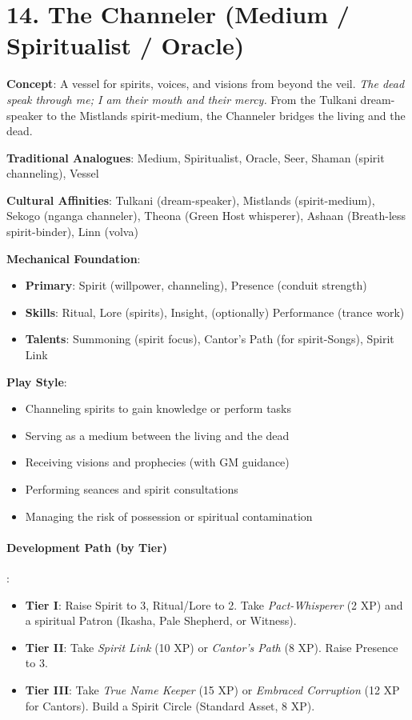 \section{14. The Channeler (Medium / Spiritualist / Oracle)}
\label{sec:concept-channeler}

\textbf{Concept}: A vessel for spirits, voices, and visions from beyond the veil. \emph{The dead speak through me; I am their mouth and their mercy.} From the Tulkani dream-speaker to the Mistlands spirit-medium, the Channeler bridges the living and the dead.

\textbf{Traditional Analogues}: Medium, Spiritualist, Oracle, Seer, Shaman (spirit channeling), Vessel

\textbf{Cultural Affinities}: Tulkani (dream-speaker), Mistlands (spirit-medium), Sekogo (nganga channeler), Theona (Green Host whisperer), Ashaan (Breath-less spirit-binder), Linn (volva)

\textbf{Mechanical Foundation}:
\begin{itemize}
\item \textbf{Primary}: Spirit (willpower, channeling), Presence (conduit strength)
\item \textbf{Skills}: Ritual, Lore (spirits), Insight, (optionally) Performance (trance work)
\item \textbf{Talents}: Summoning (spirit focus), Cantor's Path (for spirit-Songs), Spirit Link
\end{itemize}

\textbf{Play Style}:
\begin{itemize}
\item Channeling spirits to gain knowledge or perform tasks
\item Serving as a medium between the living and the dead
\item Receiving visions and prophecies (with GM guidance)
\item Performing seances and spirit consultations
\item Managing the risk of possession or spiritual contamination
\end{itemize}

\paragraph{Development Path (by Tier)}:
\begin{itemize}
\item \textbf{Tier I}: Raise Spirit to 3, Ritual/Lore to 2. Take \emph{Pact-Whisperer} (2 XP) and a spiritual Patron (Ikasha, Pale Shepherd, or Witness).
\item \textbf{Tier II}: Take \emph{Spirit Link} (10 XP) or \emph{Cantor's Path} (8 XP). Raise Presence to 3.
\item \textbf{Tier III}: Take \emph{True Name Keeper} (15 XP) or \emph{Embraced Corruption} (12 XP for Cantors). Build a Spirit Circle (Standard Asset, 8 XP).
\end{itemize}

